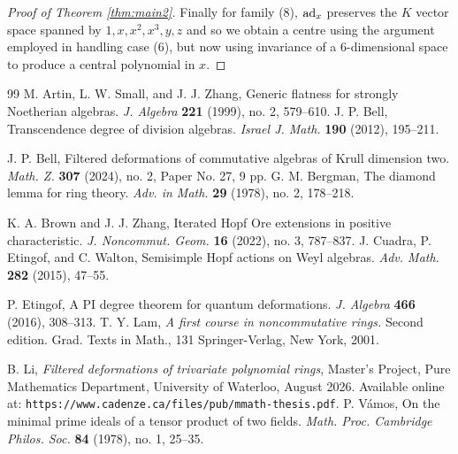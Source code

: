 \documentclass[a4paper,11pt,twoside,notitlepage,reqno]{amsart}
\theoremstyle{plain}
\numberwithin{thm}{section}
\theoremstyle{definition}
\begin{document}
\begin{proof}[Proof of Theorem \ref{thm:main2}]
Finally for family (8), ${\rm ad}_x$ preserves the $K$ vector space spanned by $1,x,x^2,x^3,y,z$ and so we obtain a centre using the argument employed in handling case (6), but now using invariance of a $6$-dimensional space to produce a central polynomial in $x$.
\end{proof}
\begin{thebibliography}{99}
 M. Artin, L. W. Small, and J. J. Zhang, 
Generic flatness for strongly Noetherian algebras.
\emph{J. Algebra} {\bf 221} (1999), no. 2, 579–610.
 J. P. Bell, Transcendence degree of division algebras. 
\emph{Israel J. Math.} {\bf 190} (2012), 195–211.

 J. P. Bell, Filtered deformations of commutative algebras of Krull dimension two.
\emph{Math. Z.} {\bf 307} (2024), no. 2, Paper No. 27, 9 pp.
 G. M. Bergman, 
The diamond lemma for ring theory.
\emph{Adv. in Math.} {\bf 29} (1978), no. 2, 178–218.

 K. A. Brown and J. J. Zhang, Iterated Hopf Ore extensions in positive characteristic.
\emph{J. Noncommut. Geom.} {\bf 16} (2022), no. 3, 787–837.
  J. Cuadra, P. Etingof, and C. Walton, Semisimple Hopf actions on Weyl
algebras. \emph{Adv. Math.} {\bf 282} (2015), 47--55.


 P. Etingof, 
A PI degree theorem for quantum deformations. \emph{J. Algebra} {\bf 466} (2016), 308–313.
 T. Y. Lam, 
\emph{A first course in noncommutative rings.} Second edition. Grad. Texts in Math., 131
Springer-Verlag, New York, 2001.

 B. Li, \emph{Filtered deformations of trivariate
polynomial rings}, Master's Project, Pure Mathematics Department, University of Waterloo, August 2026. Available online at: {\tt https://www.cadenze.ca/files/pub/mmath-thesis.pdf}.
 P. V\'amos, On the minimal prime ideals of a tensor product of two fields. \emph{Math. Proc. Cambridge Philos. Soc.} {\bf 84} (1978), no. 1, 25--35.


\end{thebibliography}



 
\end{document}
